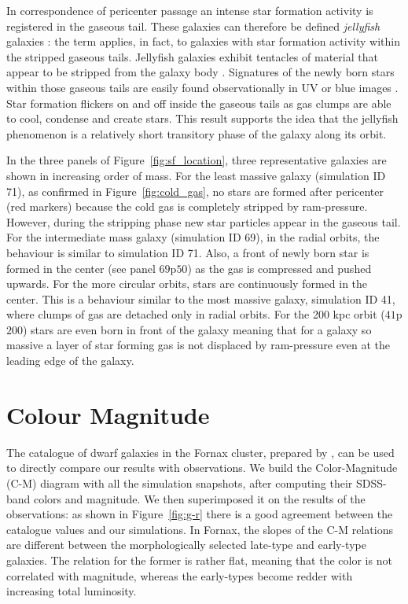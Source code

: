 In correspondence of pericenter passage an intense star formation activity is registered in the gaseous tail.
These galaxies can therefore be defined \emph{jellyfish} galaxies \citep{Ebeling2013}:
the term applies, in fact, to galaxies with star formation activity within the stripped gaseous tails.
Jellyfish galaxies exhibit tentacles of material that appear to be stripped from the galaxy body \citep{Poggianti2017a, Poggianti2019b, Ramatsoku2020}.
Signatures of the newly born stars within those gaseous tails are easily found observationally in UV or blue images \citep{Cortese2007,Smith2010a}.
Star formation flickers on and off inside the gaseous tails as gas clumps are able to cool, condense and create stars.
This result supports the idea that the jellyfish phenomenon is a relatively short transitory phase of the galaxy along its orbit.

In the three panels of Figure~\ref{fig:sf_location}, three representative galaxies are shown in increasing order of mass.
For the least massive galaxy (simulation ID 71), as confirmed in Figure~\ref{fig:cold_gas}, no stars are formed after pericenter (red markers) because the cold gas is completely stripped by ram-pressure.
However, during the stripping phase new star particles appear in the gaseous tail.
For the intermediate mass galaxy (simulation ID 69), in the radial orbits, the behaviour is similar to simulation ID 71.
Also, a front of newly born star is formed in the center (see panel $69$p$50$) as the gas is compressed and pushed upwards.
For the more circular orbits, stars are continuously formed in the center.
This is a behaviour similar to the most massive galaxy, simulation ID 41, where clumps of gas are detached only in radial orbits.
For the 200 kpc orbit ($41$p$200$) stars are even born in front of the galaxy meaning that for a galaxy so massive a layer of star forming gas is not displaced by ram-pressure even at the leading edge of the galaxy.

\section{Colour Magnitude} \label{sec:CM}
The catalogue of dwarf galaxies in the Fornax cluster, prepared by \citet{Venhola2019}, can be used to directly compare our results with observations.
We build the Color-Magnitude (C-M) diagram with all the simulation snapshots, after computing their SDSS-band colors and magnitude.
We then superimposed it on the results of the observations: as shown in Figure~\ref{fig:g-r} there is a good agreement between the catalogue values and our simulations.
In Fornax, the slopes of the C-M relations are different between the morphologically selected late-type and early-type galaxies.
The relation for the former is rather flat, meaning that the color is not correlated with magnitude, whereas the early-types become redder with increasing total luminosity.

